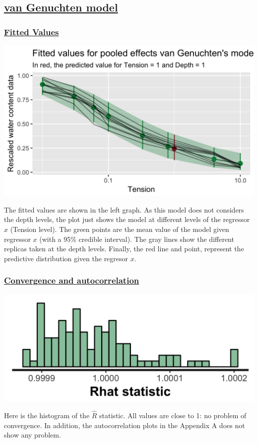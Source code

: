 \documentclass{article}
\begin{document}
 \newpage
 \subsection*{\underline{van Genuchten model}}

\subsubsection*{\underline{Fitted Values}}
\begin{minipage}{0.50\textwidth}
\includegraphics[width=\linewidth]{pooled_3pars_pred.png}
\end{minipage}
\begin{minipage}{0.50\textwidth}
The fitted values are shown in the left graph. As this model does not considers the depth levels, the plot just shows the model at different levels of the regressor $x$ (Tension level). The green points are the mean value of the model given regressor $x$ (with a 95\% credible interval). The gray lines show the different replicas taken at the depth levels. Finally, the red line and point, represent the predictive distribution given the regresor $x$.
\end{minipage}


\subsubsection*{\underline{Convergence and autocorrelation}}
\begin{minipage}{0.50\textwidth}
\includegraphics[width=\linewidth]{pooled_3pars_rhat.png}
\end{minipage}
\begin{minipage}{0.50\textwidth}
Here is the histogram of the $\widehat{R}$ statistic. All values are close to 1: no problem of convergence. In addition, the autocorrelation plots in the Appendix A does not show any problem.
\end{minipage}
\end{document}
